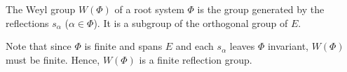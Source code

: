 The Weyl group $W(\Phi)$ of a root system $\Phi$ is the group generated
by the reflections $s_\alpha$ ($\alpha \in \Phi$). It is a subgroup
of the orthogonal group of $E$.

Note that since $\Phi$ is finite and spans $E$ and each $s_\alpha$ leaves $\Phi$
invariant, $W(\Phi)$ must be finite. Hence, $W(\Phi)$ is a finite reflection
group.
